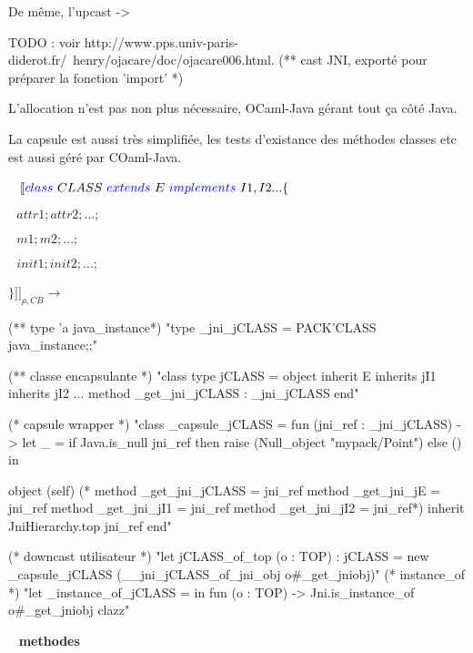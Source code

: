 \documentclass[a4paper, 11pt, notitlepage]{article}
\begin{document}
De même, l'upcast -> 

TODO : voir http://www.pps.univ-paris-diderot.fr/~henry/ojacare/doc/ojacare006.html. (** cast JNI, exporté pour préparer la fonction 'import' *)

L'allocation n'est pas non plus nécessaire, OCaml-Java gérant tout ça côté Java. 

La capsule est aussi très simplifiée, les tests d'existance des méthodes classes etc est aussi géré par COaml-Java.

\ 
\newline
\noindent
$[\![ {\color{blue}class}\ CLASS\ 
 {\color{blue}extends}\  E \ 
 {\color{blue}implements}\  I1,I2... \{$

 $ \ \ \ attr1; attr2; ...;$

  $\ \ \ m1; m2; ...;$

  $\ \ \ init1; init2; ...;$

 $\} ]\!]_{\rho,CB}\longrightarrow$
\ 
\newline

\begin{OCaml}

(** type 'a java_instance*)
"type _jni_jCLASS = PACK'CLASS java_instance;;"

(** classe encapsulante *)
"class type jCLASS =
   object inherit E
   inherits jI1
   inherits jI2 ...
   method _get_jni_jCLASS : _jni_jCLASS
   end"

(* capsule wrapper *)
"class _capsule_jCLASS = 
  fun (jni_ref : _jni_jCLASS) ->
     let _ =
        if Java.is_null jni_ref
        then raise (Null_object "mypack/Point")
        else ()
     in

    object (self)
     (* method _get_jni_jCLASS = jni_ref
      method _get_jni_jE = jni_ref
      method _get_jni_jI1 = jni_ref
      method _get_jni_jI2 = jni_ref*)
      inherit JniHierarchy.top jni_ref
    end"

(* downcast utilisateur *)
"let jCLASS_of_top (o : TOP) : jCLASS =
    new _capsule_jCLASS (__jni_jCLASS_of_jni_obj o#_get_jniobj)"
(* instance_of *)
"let _instance_of_jCLASS =
    in fun (o : TOP) -> Jni.is_instance_of o#_get_jniobj clazz"


\end{OCaml}
\ 
\newline
\noindent
\textbf{ methodes } 
\end{document}
